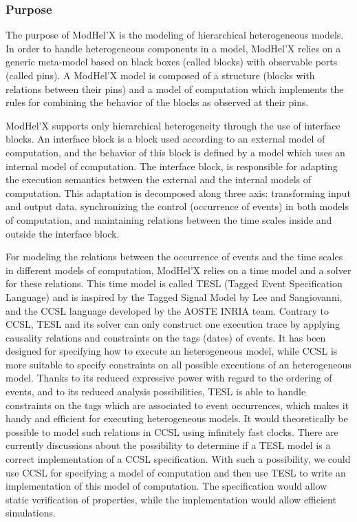 \documentclass{gemoc} %
\begin{document}
\subsubsection{Purpose}
The purpose of ModHel'X is the modeling of hierarchical heterogeneous models. In order to handle heterogeneous components in a model, ModHel'X relies on a generic meta-model based on black boxes (called blocks) with observable ports (called pins). A ModHel'X model is composed of a structure (blocks with relations between their pins) and a model of computation which implements the rules for combining the behavior of the blocks as observed at their pins.

ModHel'X supports only hierarchical heterogeneity through the use of interface blocks. An interface block is a block used according to an external model of computation, and the behavior of this block is defined by a model which uses an internal model of computation. The interface block, is responsible for adapting the execution semantics between the external and the internal models of computation. This adaptation is decomposed along three axis: transforming input and output data, synchronizing the control (occurrence of events) in both models of computation, and maintaining relations between the time scales inside and outside the interface block.

For modeling the relations between the occurrence of events and the time scales in different models of computation, ModHel'X relies on a time model and a solver for these relations. This time model is called TESL (Tagged Event Specification Language) and is inspired by the Tagged Signal Model by Lee and Sangiovanni, and the CCSL language developed by the AOSTE INRIA team. Contrary to CCSL, TESL and its solver can only construct one execution trace by applying causality relations and constraints on the tags (dates) of events. It has been designed for specifying how to execute an heterogeneous model, while CCSL is more suitable to specify constraints on all possible executions of an heterogeneous model. Thanks to its reduced expressive power with regard to the ordering of events, and to its reduced analysis possibilities, TESL is able to handle constraints on the tags which are associated to event occurrences, which makes it handy and efficient for executing heterogeneous models. It would theoretically be possible to model such relations in CCSL using infinitely fast clocks. There are currently discussions about the possibility to determine if a TESL model is a correct implementation of a CCSL specification. With such a possibility, we could use CCSL for specifying a model of computation and then use TESL to write an implementation of this model of computation. The specification would allow static verification of properties, while the implementation would allow efficient simulations.
\end{document}
